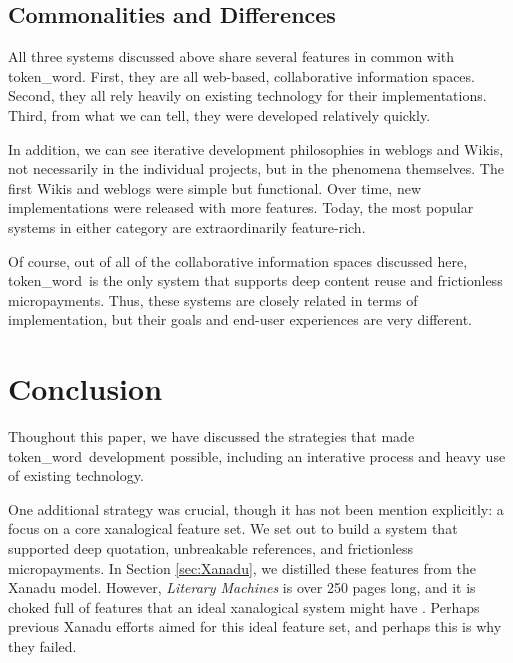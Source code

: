 \documentclass{acm_proc_article-sp}
\newcommand{\tw}{token\_word}
\begin{document}
\subsection{Commonalities and Differences}
All three systems discussed above share several features in common with \tw.
First, they are all web-based, collaborative information spaces.
Second, they all rely heavily on existing technology for their implementations.
Third, from what we can tell, they were developed relatively quickly.

In addition, we can see iterative development philosophies in weblogs and Wikis, not necessarily in the individual projects, but in the phenomena themselves.
The first Wikis and weblogs were simple but functional.
Over time, new implementations were released with more features.
Today, the most popular systems in either category are extraordinarily feature-rich.

Of course, out of all of the collaborative information spaces discussed here, \tw \  is the only system that supports deep content reuse and frictionless micropayments.
Thus, these systems are closely related in terms of implementation, but their goals and end-user experiences are very different. 




\section{Conclusion}
Thoughout this paper, we have discussed the strategies that made \tw \  development possible, including an interative process and heavy use of existing technology.

One additional strategy was crucial, though it has not been mention explicitly:  a focus on a core xanalogical feature set.
We set out to build a system that supported deep quotation, unbreakable references, and frictionless micropayments.
In Section \ref{sec:Xanadu}, we distilled these features from the Xanadu model.
However, {\it Literary Machines} is over 250 pages long, and it is choked full of features that an ideal xanalogical system might have \cite{NelsonLiteraryMachines}.
Perhaps previous Xanadu efforts aimed for this ideal feature set, and perhaps this is why they failed.
\end{document}
